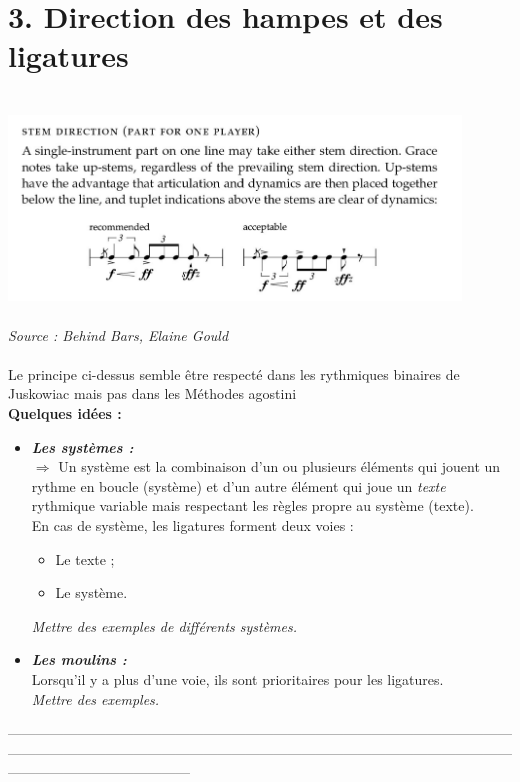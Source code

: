 \section*{3. Direction des hampes et des ligatures}
\includegraphics[height=60mm, width=120mm]{images/hampes_0.png} \\\textit{Source : Behind Bars, Elaine Gould}\\\\
Le principe ci-dessus semble être respecté dans les rythmiques binaires de Juskowiac mais pas dans les Méthodes agostini\\

\textbf{Quelques idées :}\\
\begin{itemize}
	\item \textbf{\textit{Les systèmes :}}\\
	$\Rightarrow$ Un système est la combinaison d’un ou plusieurs éléments qui jouent un rythme en boucle (système) et d’un autre élément qui joue un \textit{texte} rythmique variable mais respectant les règles propre au système (texte).\\
	En cas de système, les ligatures forment deux voies :
	\begin{itemize}
		\item Le texte ;
		\item Le système.
	\end{itemize}
	\textit{Mettre des exemples de différents systèmes.}
	\item \textbf{\textit{Les moulins :}}\\
	Lorsqu’il y a plus d’une voie, ils sont prioritaires pour les ligatures.\\
	\textit{Mettre des exemples.}\\
\end{itemize}
—————————————————————————————————————————————————————————————————————————————————————\\\\